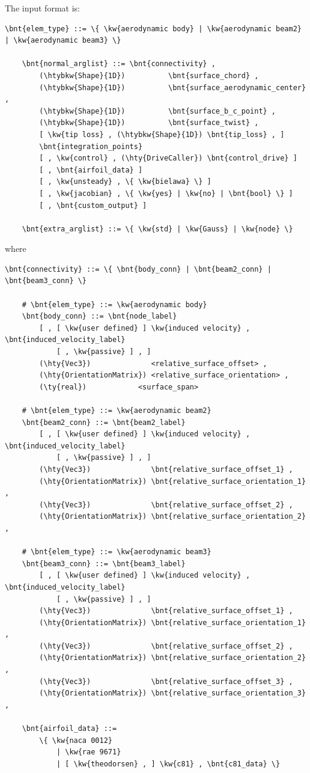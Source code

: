 The input format is:
\begin{Verbatim}[commandchars=\\\{\}]
    \bnt{elem_type} ::= \{ \kw{aerodynamic body} | \kw{aerodynamic beam2} | \kw{aerodynamic beam3} \}

    \bnt{normal_arglist} ::= \bnt{connectivity} ,
        (\htybkw{Shape}{1D})          \bnt{surface_chord} ,
        (\htybkw{Shape}{1D})          \bnt{surface_aerodynamic_center} ,
        (\htybkw{Shape}{1D})          \bnt{surface_b_c_point} ,
        (\htybkw{Shape}{1D})          \bnt{surface_twist} ,
        [ \kw{tip loss} , (\htybkw{Shape}{1D}) \bnt{tip_loss} , ]
        \bnt{integration_points}
        [ , \kw{control} , (\hty{DriveCaller}) \bnt{control_drive} ]
        [ , \bnt{airfoil_data} ]
        [ , \kw{unsteady} , \{ \kw{bielawa} \} ]
        [ , \kw{jacobian} , \{ \kw{yes} | \kw{no} | \bnt{bool} \} ]
        [ , \bnt{custom_output} ]

    \bnt{extra_arglist} ::= \{ \kw{std} | \kw{Gauss} | \kw{node} \}
\end{Verbatim}
where
\begin{Verbatim}[commandchars=\\\{\}]
    \bnt{connectivity} ::= \{ \bnt{body_conn} | \bnt{beam2_conn} | \bnt{beam3_conn} \}

    # \bnt{elem_type} ::= \kw{aerodynamic body}
    \bnt{body_conn} ::= \bnt{node_label}
        [ , [ \kw{user defined} ] \kw{induced velocity} , \bnt{induced_velocity_label}
            [ , \kw{passive} ] , ]
        (\hty{Vec3})              <relative_surface_offset> ,
        (\hty{OrientationMatrix}) <relative_surface_orientation> ,
        (\ty{real})            <surface_span>

    # \bnt{elem_type} ::= \kw{aerodynamic beam2}
    \bnt{beam2_conn} ::= \bnt{beam2_label}
        [ , [ \kw{user defined} ] \kw{induced velocity} , \bnt{induced_velocity_label}
            [ , \kw{passive} ] , ]
        (\hty{Vec3})              \bnt{relative_surface_offset_1} ,
        (\hty{OrientationMatrix}) \bnt{relative_surface_orientation_1} ,
        (\hty{Vec3})              \bnt{relative_surface_offset_2} ,
        (\hty{OrientationMatrix}) \bnt{relative_surface_orientation_2} ,

    # \bnt{elem_type} ::= \kw{aerodynamic beam3}
    \bnt{beam3_conn} ::= \bnt{beam3_label}
        [ , [ \kw{user defined} ] \kw{induced velocity} , \bnt{induced_velocity_label}
            [ , \kw{passive} ] , ]
        (\hty{Vec3})              \bnt{relative_surface_offset_1} ,
        (\hty{OrientationMatrix}) \bnt{relative_surface_orientation_1} ,
        (\hty{Vec3})              \bnt{relative_surface_offset_2} ,
        (\hty{OrientationMatrix}) \bnt{relative_surface_orientation_2} ,
        (\hty{Vec3})              \bnt{relative_surface_offset_3} ,
        (\hty{OrientationMatrix}) \bnt{relative_surface_orientation_3} ,

    \bnt{airfoil_data} ::=
        \{ \kw{naca 0012}
            | \kw{rae 9671}
            | [ \kw{theodorsen} , ] \kw{c81} , \bnt{c81_data} \}
\end{Verbatim}
